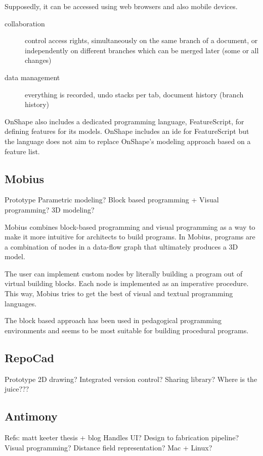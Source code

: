 Supposedly, it can be accessed using web browsers and also mobile devices.

\begin{description}
	\item[collaboration] control access rights, simultaneously on the same branch of a document, or independently on different branches which can be merged later (some or all changes)
	\item[data management] everything is recorded, undo stacks per tab, document history (branch history)
\end{description}

OnShape also includes a dedicated programming language, FeatureScript, for defining features for its models.
OnShape includes an \gls{ide} for FeatureScript but the language does not aim to replace OnShape's modeling approach based on a feature list.


\subsection{Mobius}
Prototype
Parametric modeling? Block based programming + Visual programming? 3D modeling?

Mobius combines block-based programming and visual programming as a way to make it more intuitive for architects to build programs.
In Mobius, programs are a combination of nodes in a data-flow graph that ultimately produces a 3D model.

The user can implement custom nodes by literally building a program out of virtual building blocks.
Each node is implemented as an imperative procedure.
This way, Mobius tries to get the best of visual and textual programming languages.

The block based approach has been used in pedagogical programming environments and seems to be most suitable for building procedural programs.


\subsection{RepoCad}
Prototype
2D drawing? Integrated version control? Sharing library?
Where is the juice???


\subsection{Antimony}
Refs: matt keeter thesis + blog
Handles UI? Design to fabrication pipeline? Visual programming? Distance field representation? Mac + Linux?

